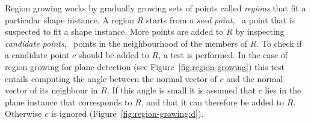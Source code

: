 Region growing works by gradually growing sets of points called \emph{regions} that fit a particular shape instance.
A region $R$ starts from a \emph{seed point}, \ie\ a point that is suspected to fit a shape instance.
More points are added to $R$ by inspecting \emph{candidate points}, \ie\ points in the neighbourhood of the members of $R$.
To check if a candidate point $c$ should be added to $R$, a test is performed.
In the case of region growing for plane detection (see Figure~\ref{fig:region-growing}) this test entails computing the angle between the normal vector of $c$ and the normal vector of its neighbour in $R$.
If this angle is small it is assumed that $c$ lies in the plane instance that corresponds to $R$, and that it can therefore be added to $R$.
Otherwise $c$ is ignored (Figure~\ref{fig:region-growing:d}).
